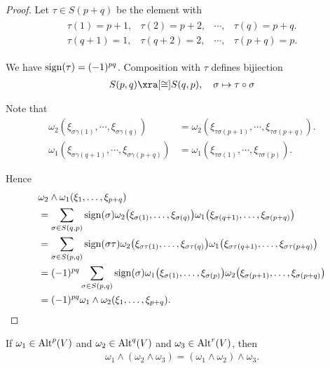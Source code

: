 \begin{proof}
  Let $\tau\in S(p+q)$ be the element with
  \begin{align*}
    \begin{array}{cccc}
      \tau(1)  = p+1 , & \tau(2)  = p+2, & \cdots, & \tau(q) = p+q. \\
      \tau(q+1) = 1,   & \tau(q+2) = 2,  & \cdots, & \tau(p+q) = p.
    \end{array}
  \end{align*}

  We have $\operatorname{sign}(\tau) = (-1)^{pq}$. Composition with $\tau$ defines bijiection
  \begin{align*}
    S(p, q) \xra[\cong] S(q, p), \quad \sigma\mapsto\tau\circ\sigma
  \end{align*}

  Note that
  \begin{align*}
    \omega_2(\xi_{\sigma\gamma(1)}, \cdots, \xi_{\sigma\gamma(q)})
    & = \omega_2(\xi_{\tau\sigma(p+1)}, \cdots, \xi_{\tau\sigma(p+q)}). \\
    \omega_1(\xi_{\sigma\gamma(q+1)}, \cdots, \xi_{\sigma\gamma(p+q)})
    & = \omega_1(\xi_{\tau\sigma(1)}, \cdots, \xi_{\tau\sigma(p)}).
  \end{align*}

  Hence
  \begin{align*}
    & \omega_{2}\wedge\omega_{1}(\xi_{1},\ldots,\xi_{p+q})                                                         \\
    & = \sum_{\sigma\in S(q,p)}\operatorname{sign}(\sigma)\omega_{2}\big(\xi_{\sigma(1)},\ldots,\xi_{\sigma(q)}\big)
  \omega_{1}\big(\xi_{\sigma(q+1)},\ldots,\xi_{\sigma(p+q)}\big)                                                  \\
    & = \sum_{\sigma\in S(p,q)}\operatorname{sign}(\sigma\tau)\omega_{2}\big(\xi_{\sigma\tau(1)},\ldots,\xi_{\sigma\tau(q)}\big)
  \omega_{1}\big(\xi_{\sigma\tau(q+1)},\ldots,\xi_{\sigma\tau(p+q)}\big)                                          \\
    & = (-1)^{pq}\sum_{\sigma\in S(p,q)}\operatorname{sign}(\sigma)\omega_{1}\big(\xi_{\sigma(1)},\ldots,\xi_{\sigma(p)}\big)
  \omega_{2}\big(\xi_{\sigma(p+1)},\ldots,\xi_{\sigma(p+q)}\big)                                                  \\
    & = (-1)^{pq}\omega_{1}\wedge\omega_{2}(\xi_{1},\ldots,\xi_{p+q}).
  \end{align*}
\end{proof}


\begin{lemma}
  If $\omega_1\in\operatorname{Alt}^p(V)$ and $\omega_2\in\operatorname{Alt}^q(V)$ and $\omega_3\in\operatorname{Alt}^r(V)$, then
  \begin{align*}
    \omega_1\wedge(\omega_2\wedge\omega_3) = (\omega_1\wedge\omega_2)\wedge\omega_3.
  \end{align*}
\end{lemma}

